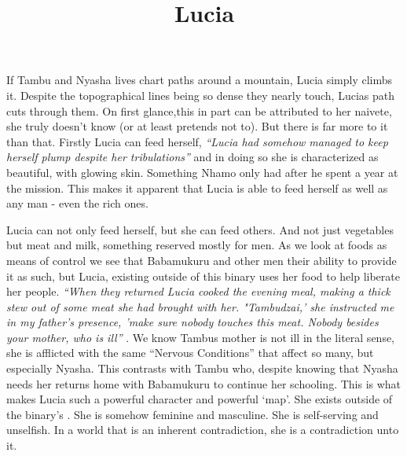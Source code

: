 \documentclass{article}
\title{Lucia}
\begin{document}
If Tambu and Nyasha lives chart paths around a mountain, Lucia simply climbs it. Despite the topographical lines being so dense they nearly touch, Lucias path cuts through them. On first glance,this in part can be attributed to her naivete, she truly doesn't know (or at least pretends not to). But there is far more to it than that. Firstly Lucia can feed herself, \textit{``Lucia had somehow managed to keep herself plump despite her tribulations''} and in doing so she is characterized as beautiful, with glowing skin. Something Nhamo only had after he spent a year at the mission. This makes it apparent that Lucia is able to feed herself as well as any man - even the rich ones. 

Lucia can not only feed herself, but she can feed others. And not just vegetables but meat and milk, something reserved mostly for men. As we look at foods as means of control we see that Babamukuru and other men their ability to provide it as such, but Lucia, existing outside of this binary uses her food to help liberate her people. \textit{``When they returned Lucia cooked the evening meal, making a thick stew out of some meat she had brought with her. "Tambudzai,' she instructed me in my father's presence, 'make sure nobody touches this meat. Nobody besides your mother, who is ill'' }. We know Tambus mother is not ill in the literal sense,  she is afflicted with the same ``Nervous Conditions'' that affect so many, but especially Nyasha. This contrasts with Tambu who, despite knowing that Nyasha needs her returns home with Babamukuru to continue her schooling. This is what makes Lucia such a powerful character and powerful `map'. She exists outside of the binary's . She is somehow feminine and masculine. She is self-serving and unselfish. In a world that is an inherent contradiction, she is a contradiction unto it. 
\end{document}

